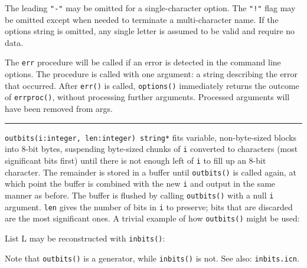 The leading \texttt{"-"} may be omitted for
a single-character option. The \texttt{"!"}
flag may be omitted except when needed to terminate a multi-character
name. %
If the options string is omitted, any single letter is assumed to be valid and
require no data.

The \texttt{err} procedure will be called if an error is detected in the
command line options. The procedure is called with one argument: a
string describing the error that occurred. After \texttt{err()} is
called, \texttt{options()} immediately returns the outcome of
\texttt{errproc()}, without processing further arguments.
Processed arguments will have been removed from args.

\vspace{0.25cm}\hrule{}

\texttt{outbits(i:integer, len:integer) string*} fits variable,
non-byte-sized blocks into 8-bit bytes,
suspending byte-sized chunks of \texttt{i} converted to characters
(most significant bits first) until there is not enough left of
\texttt{i} to fill up an 8-bit character. The remainder is
stored in a buffer until \texttt{outbits()} is called again, at which
point the buffer is combined with the new \texttt{i} and output in
the same manner as before. The buffer is flushed by calling
\texttt{outbits()} with a null \texttt{i} argument. 
\texttt{len} gives the number of bits in \texttt{i} to preserve;
bits that are discarded are the most significant ones. A trivial
example of how \texttt{outbits()} might be used:


\noindent List L may be reconstructed with \texttt{inbits()}:


\noindent Note that \texttt{outbits()} is a generator, while
\texttt{inbits()} is not.
See also: \texttt{inbits.icn}.

